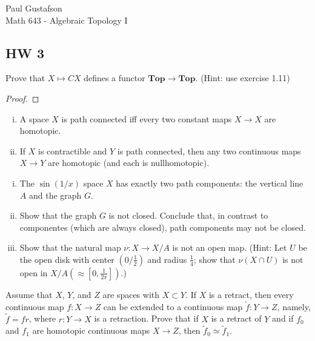 \documentclass{article}
\begin{document}
\noindent Paul Gustafson\\
\noindent Math 643 - Algebraic Topology I


\subsection*{HW 3}
 Prove that $X \mapsto CX$ defines a functor $\mathbf{Top}  \to \mathbf{Top}$. (Hint: use exercise 1.11)
\begin{proof}

\end{proof}

 \begin{enumerate}[(i)] 
\item A space $X$ is path connected iff every two constant maps $X \to X$ are homotopic.
\item If $X$ is contractible and $Y$ is path connected, then any two continuous maps
$X \to Y$ are homotopic (and each is nullhomotopic).
\end{enumerate}

\begin{enumerate}[(i)] 
\item The $\sin(1/x)$ space $X$ has exactly two path components: the vertical line $A$ 
and the graph $G$.
\item Show that the graph $G$ is not closed. Conclude that, in contrast to componentes
(which are always closed), path components may not be closed.
\item Show that the natural map $\nu: X \to X/A$ is not an open map. (Hint: Let $U$
be the open disk with center $(0/\frac 1 2)$ and radius $\frac 1 4$; show that $\nu(X \cap U)$
is not open in $X/A (\approx [0, \frac 1 {2 \pi}])$.)
\end{enumerate}


 Assume that $X$, $Y$, and $Z$ are spaces with $X \subset Y$. If $X$ is a retract, then 
every continuous map $f: X \to Z$ can be extended to a continuous map $\tilde f : Y \to Z$, 
namely, $\tilde f = fr$, where $r: Y \to X$ is a retraction. Prove that if $X$ is a retract of
$Y$ and if $f_0$ and $f_1$ are homotopic continuous maps $X \to Z$, then $\tilde f_0 \simeq \tilde f_1$.
\end{document}
